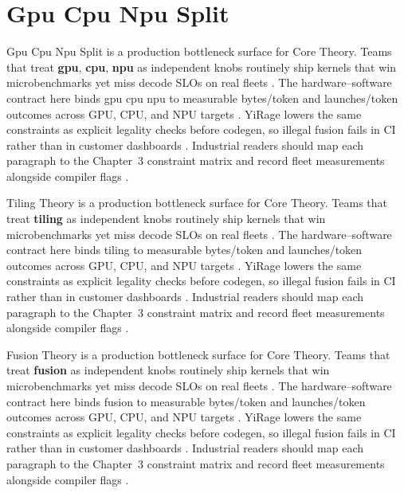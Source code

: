 \section{Gpu Cpu Npu Split}
\label{sec:gpu_cpu_npu_split}

Gpu Cpu Npu Split is a production bottleneck surface for Core Theory. Teams that treat \textbf{gpu}, \textbf{cpu}, \textbf{npu} as independent knobs routinely ship kernels that win microbenchmarks yet miss decode SLOs on real fleets \citep{semianalysis2024tma,dlbook}. The hardware--software contract here binds gpu cpu npu to measurable bytes/token and launches/token outcomes across GPU, CPU, and NPU targets \citep{amd2024xdna,dao2022flashattention}. YiRage lowers the same constraints as explicit legality checks before codegen, so illegal fusion fails in CI rather than in customer dashboards \citep{amd2024aie,kwon2023vllm}. Industrial readers should map each paragraph to the Chapter~3 constraint matrix and record fleet measurements alongside compiler flags \citep{dlbook,nvidia2024cudagraphs}.

Tiling Theory is a production bottleneck surface for Core Theory. Teams that treat \textbf{tiling} as independent knobs routinely ship kernels that win microbenchmarks yet miss decode SLOs on real fleets \citep{memoryfloor2026,amd2024xdna}. The hardware--software contract here binds tiling to measurable bytes/token and launches/token outcomes across GPU, CPU, and NPU targets \citep{nvidia2022hopper,amd2024aie}. YiRage lowers the same constraints as explicit legality checks before codegen, so illegal fusion fails in CI rather than in customer dashboards \citep{semianalysis2024tma,dlbook}. Industrial readers should map each paragraph to the Chapter~3 constraint matrix and record fleet measurements alongside compiler flags \citep{amd2024xdna,dao2022flashattention}.

Fusion Theory is a production bottleneck surface for Core Theory. Teams that treat \textbf{fusion} as independent knobs routinely ship kernels that win microbenchmarks yet miss decode SLOs on real fleets \citep{nvidia2022hopper,amd2024aie}. The hardware--software contract here binds fusion to measurable bytes/token and launches/token outcomes across GPU, CPU, and NPU targets \citep{semianalysis2024tma,dlbook}. YiRage lowers the same constraints as explicit legality checks before codegen, so illegal fusion fails in CI rather than in customer dashboards \citep{amd2024xdna,dao2022flashattention}. Industrial readers should map each paragraph to the Chapter~3 constraint matrix and record fleet measurements alongside compiler flags \citep{amd2024aie,kwon2023vllm}.

